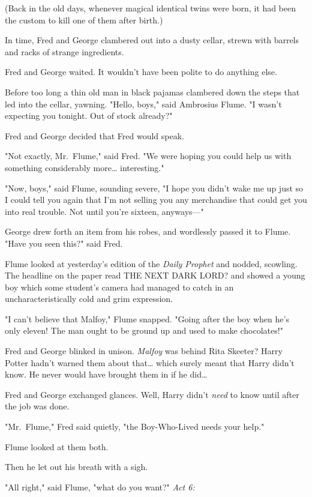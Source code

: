 (Back in the old days, whenever magical identical twins were born, it had been 
the custom to kill one of them after birth.)

In time, Fred and George clambered out into a dusty cellar, strewn with barrels 
and racks of strange ingredients.

Fred and George waited. It wouldn't have been polite to do anything else.

Before too long a thin old man in black pajamas clambered down the steps that 
led into the cellar, yawning. "Hello, boys," said Ambrosius Flume. "I wasn't 
expecting you tonight. Out of stock already?"

Fred and George decided that Fred would speak.

"Not exactly, Mr.~Flume," said Fred. "We were hoping you could help us with 
something considerably more{\ldots} interesting."

"Now, boys," said Flume, sounding severe, "I hope you didn't wake me up just so 
I could tell you again that I'm not selling you any merchandise that could get 
you into real trouble. Not until you're sixteen, anyways---"

George drew forth an item from his robes, and wordlessly passed it to Flume. 
"Have you seen this?" said Fred.

Flume looked at yesterday's edition of the \emph{Daily Prophet} and nodded, 
scowling. The headline on the paper read THE NEXT DARK LORD? and showed a young 
boy which some student's camera had managed to catch in an uncharacteristically 
cold and grim expression.

"I can't believe that Malfoy," Flume snapped. "Going after the boy when he's 
only eleven! The man ought to be ground up and used to make chocolates!"

Fred and George blinked in unison. \emph{Malfoy} was behind Rita Skeeter? Harry 
Potter hadn't warned them about that{\ldots} which surely meant that Harry 
didn't know. He never would have brought them in if he did{\ldots}

Fred and George exchanged glances. Well, Harry didn't \emph{need} to know until 
after the job was done.

"Mr.~Flume," Fred said quietly, "the Boy-Who-Lived needs your help."

Flume looked at them both.

Then he let out his breath with a sigh.

"All right," said Flume, "what do you want?"
\sbreak
\emph{Act 6:}

